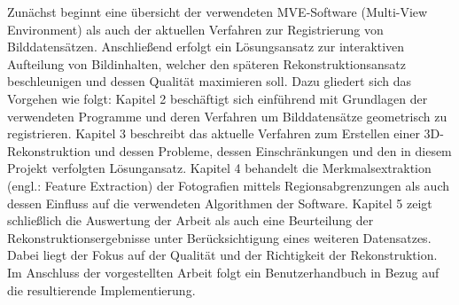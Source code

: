 Zun\"achst beginnt eine \"ubersicht der verwendeten MVE-Software (Multi-View Environment) als auch der aktuellen Verfahren zur Registrierung von Bilddatens\"atzen. Anschlie\ss end erfolgt ein L\"osungsansatz zur interaktiven Aufteilung von Bildinhalten, welcher den sp\"ateren Rekonstruktionsansatz beschleunigen und dessen Qualit\"at maximieren soll. Dazu gliedert sich das Vorgehen wie folgt:
\newline
\newline
Kapitel 2 besch\"aftigt sich einf\"uhrend mit Grundlagen der verwendeten Programme und deren Verfahren um Bilddatens\"atze geometrisch zu registrieren.
\newline
\newline
Kapitel 3 beschreibt das aktuelle Verfahren zum Erstellen einer 3D-Rekonstruktion und dessen Probleme, dessen Einschr\"ankungen und den in diesem Projekt verfolgten L\"osungansatz.
\newline
\newline
Kapitel 4 behandelt die Merkmalsextraktion (engl.: Feature Extraction) der Fotografien mittels Regionsabgrenzungen als auch dessen Einfluss auf die verwendeten Algorithmen der Software. 
\newline
\newline
Kapitel 5 zeigt schlie\ss lich die Auswertung der Arbeit als auch eine Beurteilung der Rekonstruktionsergebnisse unter Ber\"ucksichtigung eines weiteren Datensatzes. Dabei liegt der Fokus auf der Qualit\"at und der Richtigkeit der Rekonstruktion.
\newline
\newline
Im Anschluss der vorgestellten Arbeit folgt ein Benutzerhandbuch in Bezug auf die resultierende Implementierung.






